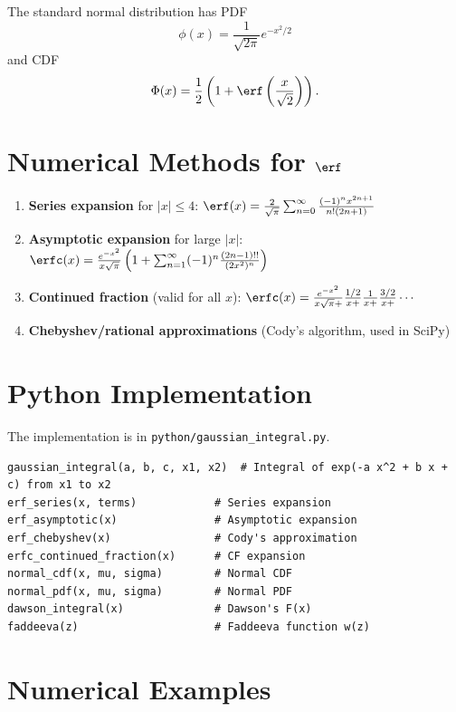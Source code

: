The standard normal distribution has PDF
\[
\phi(x) = \frac{1}{\sqrt{2\pi}} e^{-x^2/2}
\]
and CDF
\[
\Phi(x) = \frac{1}{2} \left(1 + \erf\left(\frac{x}{\sqrt{2}}\right)\right).
\]

\section{Numerical Methods for $\erf$}

\begin{enumerate}
    \item \textbf{Series expansion} for $|x| \le 4$:
    $\erf(x) = \frac{2}{\sqrt{\pi}} \sum_{n=0}^{\infty} \frac{(-1)^n x^{2n+1}}{n!(2n+1)}$
    
    \item \textbf{Asymptotic expansion} for large $|x|$:
    $\erfc(x) = \frac{e^{-x^2}}{x\sqrt{\pi}} \left(1 + \sum_{n=1}^{\infty} (-1)^n \frac{(2n-1)!!}{(2x^2)^n} \right)$
    
    \item \textbf{Continued fraction} (valid for all $x$):
    $\erfc(x) = \frac{e^{-x^2}}{x\sqrt{\pi} +} \frac{1/2}{x +} \frac{1}{x +} \frac{3/2}{x +} \cdots$
    
    \item \textbf{Chebyshev/rational approximations} (Cody's algorithm, used in SciPy)
\end{enumerate}

\section{Python Implementation}

The implementation is in \texttt{python/gaussian\_integral.py}.

\begin{lstlisting}[style=python, caption={Key functions in python/gaussian\_integral.py}]
gaussian_integral(a, b, c, x1, x2)  # Integral of exp(-a x^2 + b x + c) from x1 to x2
erf_series(x, terms)            # Series expansion
erf_asymptotic(x)               # Asymptotic expansion
erf_chebyshev(x)                # Cody's approximation
erfc_continued_fraction(x)      # CF expansion
normal_cdf(x, mu, sigma)        # Normal CDF
normal_pdf(x, mu, sigma)        # Normal PDF
dawson_integral(x)              # Dawson's F(x)
faddeeva(z)                     # Faddeeva function w(z)
\end{lstlisting}

\section{Numerical Examples}


